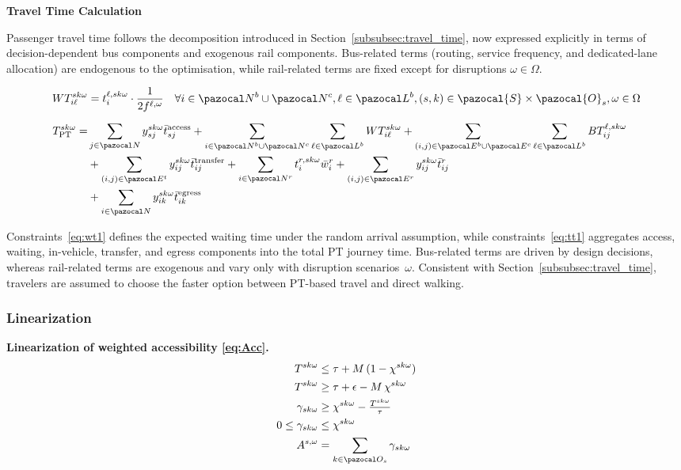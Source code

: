 \documentclass[3p,times,procedia]{elsarticle}
\begin{document}
\textbf{Travel Time Calculation}

Passenger travel time follows the decomposition introduced in Section~\ref{subsubsec:travel_time}, now expressed explicitly in terms of decision-dependent bus components and exogenous rail components. Bus-related terms (routing, service frequency, and dedicated-lane allocation) are endogenous to the optimisation, while rail-related terms are fixed except for disruptions $\omega \in \Omega$. 

\begin{align}
WT_{i\ell}^{sk\omega} &= t_{i}^{\ell,sk\omega} \cdot \frac{1}{2f^{\ell,\omega}}
\quad \forall i \in \pazocal N^b \cup \pazocal N^c, \ell \in \pazocal L^b, (s,k)\in \pazocal{S}\times\pazocal{O}_s, \omega \in \Omega \label{eq:wt1} \\[6pt]
T^{sk\omega}_{\text{PT}} =& \sum_{j \in \pazocal N} y_{sj}^{sk\omega} \bar{t}_{sj}^{\text{access}}
+ \sum_{i \in \pazocal N^b \cup \pazocal N^c} \sum_{\ell \in \pazocal L^b} WT_{i\ell}^{sk\omega}
+ \sum_{(i,j) \in \pazocal E^b \cup \pazocal E^c} \sum_{\ell \in \pazocal L^b} BT_{ij}^{\ell,sk\omega} \notag \\
&+ \sum_{(i,j) \in \pazocal E^{t}} y_{ij}^{sk\omega} \bar{t}_{ij}^{\text{transfer}}
+ \sum_{i \in \pazocal N^r} t_{i}^{r,sk\omega} \bar{w}_i^{r}
+ \sum_{(i,j) \in \pazocal E^r} y_{ij}^{sk\omega} \bar{t}_{ij}^{r} \notag \\
&+ \sum_{i \in \pazocal N} y_{ik}^{sk\omega} \bar{t}_{ik}^{\text{egress}} \label{eq:tt1}
\end{align}

Constraints~\eqref{eq:wt1} defines the expected waiting time under the random arrival assumption, 
while constraints~\eqref{eq:tt1} aggregates access, waiting, in-vehicle, transfer, and egress components into the total PT journey time. 
Bus-related terms are driven by design decisions, whereas rail-related terms are exogenous and vary only with disruption scenarios~$\omega$. 
Consistent with Section~\ref{subsubsec:travel_time}, travelers are assumed to choose the faster option between PT-based travel and direct walking.

\subsubsection{Linearization}\label{subsubsec:linearization}

\textbf{Linearization of weighted accessibility \eqref{eq:Acc}.}
\begin{align}
T^{sk\omega} &\le \tau + M\,(1 - \chi^{sk\omega}) \label{eq:wa_l2}\\
T^{sk\omega} &\ge \tau + \epsilon - M\,\chi^{sk\omega} \label{eq:wa_l3}\\
\gamma_{sk\omega} &\ge \chi^{sk\omega} - \tfrac{T^{sk\omega}}{\tau} \label{eq:wa_l4}\\
0 \le \gamma_{sk\omega} &\le \chi^{sk\omega} \label{eq:wa_l5}\\
A^{s,\omega} &= \sum_{k \in \pazocal O_s} \gamma_{sk\omega} \label{eq:wa_l7}
\end{align}
\end{document}
